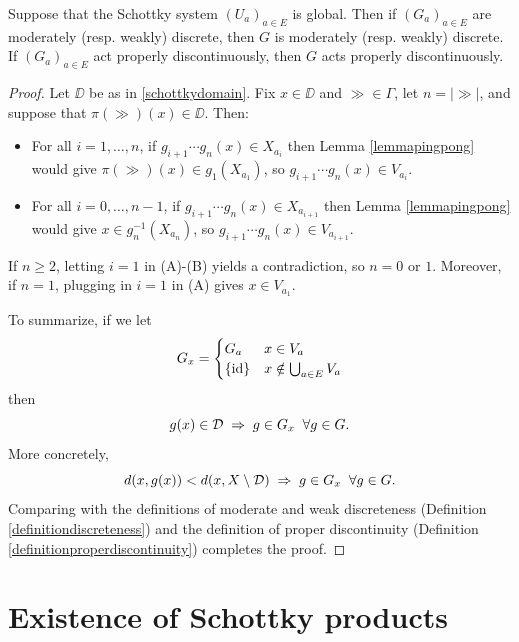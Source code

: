 \begin{proposition}
\label{propositionSproductMDWDPD}
Suppose that the Schottky system $(U_a)_{a\in E}$ is global. Then if $(G_a)_{a\in E}$ are moderately (resp. weakly) discrete, then $G$ is moderately (resp. weakly) discrete. If $(G_a)_{a\in E}$ act properly discontinuously, then $G$ acts properly discontinuously.
\end{proposition}
\begin{proof}
Let $\DD$ be as in \eqref{schottkydomain}. Fix $x\in \DD$ and $\gg \in\Gamma$, let $n = |\gg|$, and suppose that $\pi(\gg)(x)\in \DD$. Then:
\begin{itemize}
\item[(A)] For all $i = 1,\ldots,n$, if $g_{i + 1}\cdots g_n(x)\in X_{a_i}$ then Lemma \ref{lemmapingpong} would give $\pi(\gg)(x)\in g_1(X_{a_1})$, so $g_{i + 1}\cdots g_n(x)\in V_{a_i}$.
\item[(B)] For all $i = 0,\ldots,n - 1$, if $g_{i + 1}\cdots g_n(x)\in X_{a_{i + 1}}$ then Lemma \ref{lemmapingpong} would give $x\in g_n^{-1}(X_{a_n})$, so $g_{i + 1}\cdots g_n(x)\in V_{a_{i + 1}}$.
\end{itemize}
If $n\geq 2$, letting $i = 1$ in (A)-(B) yields a contradiction, so $n = 0$ or $1$. Moreover, if $n = 1$, plugging in $i = 1$ in (A) gives $x\in V_{a_1}$.

To summarize, if we let
\[
G_x = \begin{cases}
G_a & x\in V_a\\
\{\mathrm{id}\} & x\notin \bigcup_{a\in E} V_a
\end{cases}
\]
then
\[
g(x)\in \mathcal D \;\Rightarrow\; g\in G_x \;\;\forall g\in G.
\]
More concretely,
\[
d(x,g(x)) < d(x,X\setminus \mathcal D) \;\Rightarrow\; g\in G_x \;\;\forall g\in G.
\]
Comparing with the definitions of moderate and weak discreteness (Definition \ref{definitiondiscreteness}) and the definition of proper discontinuity (Definition \ref{definitionproperdiscontinuity}) completes the proof.
\end{proof}






\section{Existence of Schottky products}
\label{subsectionschottkyexamples}

